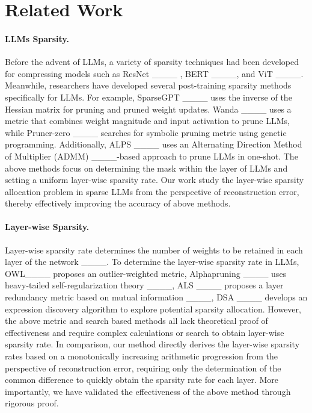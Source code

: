 \section{Related Work}
\label{RelatedWork}
\paragraph{LLMs Sparsity.} 
Before the advent of LLMs, a variety of sparsity techniques had been developed for compressing models such as ResNet ____ , BERT ____, and ViT ____. Meanwhile, researchers have developed several post-training sparsity methods specifically for LLMs. For example, SparseGPT ____ uses the inverse of the Hessian matrix for pruning and pruned weight updates. Wanda ____ uses a metric that combines weight magnitude and input activation to prune LLMs, while Pruner-zero ____ searches for symbolic pruning metric using genetic programming. Additionally, ALPS ____ uses an Alternating Direction Method of Multiplier (ADMM) ____-based approach to prune LLMs in one-shot. The above methods focus on determining the mask within the layer of LLMs and setting a uniform layer-wise sparsity rate. Our work study the layer-wise sparsity allocation problem in sparse LLMs from the perspective of reconstruction error, thereby effectively improving the accuracy of above methods.
\paragraph{Layer-wise Sparsity.} Layer-wise sparsity rate determines the number of weights to be retained in each layer of the network ____. To determine the layer-wise sparsity rate in LLMs, OWL____ proposes an outlier-weighted metric, Alphapruning ____ uses heavy-tailed self-regularization theory ____, ALS ____ proposes a layer redundancy metric based on mutual information ____, DSA ____ develops an expression discovery algorithm to explore potential sparsity allocation. However, the above metric and search based methods all lack theoretical proof of effectiveness and require complex calculations or search to obtain layer-wise sparsity rate. In comparison, our method directly derives the layer-wise sparsity rates based on a monotonically increasing arithmetic progression from the perspective of reconstruction error, requiring only the determination of the common difference to quickly obtain the sparsity rate for each layer. More importantly, we have validated the effectiveness of the above method through rigorous proof.

